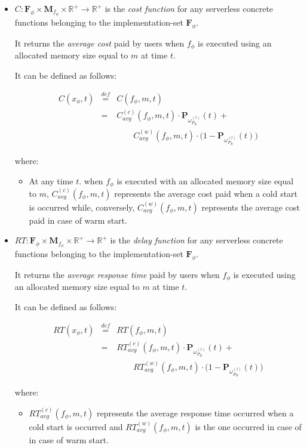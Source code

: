 \documentclass[12pt,a4paper]{report}
\newcommand{\mathDef}{\overset{\textit{def}}{=}}
\begin{document}
\begin{itemize}	
	\item $C : \textbf{F}_{\phi} \times \textbf{M}_{f_{\phi}} \times \mathbb{R}^+ \to \mathbb{R}^+$ is the \textit{cost function} for any serverless concrete functions belonging to the implementation-set $\textbf{F}_{\phi}$. 
	
	It returns the \textit{average cost} paid by users when $f_{\phi}$ is executed using an allocated memory size equal to $m$ at time $t$. 
		
	It can be defined as follows:
	
	\begin{eqnarray}
		C(x_{\phi},t) & \mathDef & C(f_{\phi},m,t) \nonumber \\
		& = & C_{avg}^{(c)}(f_{\phi}, m,t) \cdot \textbf{P}_{\omega_{P_R}^{(l)}}(t) + \\
		& & \qquad C_{avg}^{(w)}(f_{\phi}, m,t) \cdot \Big( 1 - \textbf{P}_{\omega_{P_R}^{(l)}}(t)  \Big) \nonumber
	\end{eqnarray}
	
	where:
	
	\begin{itemize}
		\item At any time $t$. when $f_{\phi}$ is executed with an allocated memory size equal to $m$, 
		$C_{avg}^{(c)}(f_{\phi}, m,t)$ represents the average cost paid when a cold start is occurred while, conversely, $C_{avg}^{(w)}(f_{\phi}, m,t)$ represents the average cost paid in case of warm start.
	\end{itemize}
	
	
	\item $RT : \textbf{F}_{\phi} \times \textbf{M}_{f_{\phi}} \times \mathbb{R}^+ \to \mathbb{R}^+$ is the \textit{delay function} for any serverless concrete functions belonging to the implementation-set $\textbf{F}_{\phi}$. 
	
	It returns the \textit{average response time} paid by users when $f_{\phi}$ is executed using an allocated memory size equal to $m$ at time $t$. 
	
	It can be defined as follows:
	
	\begin{eqnarray}
		RT(x_{\phi},t) & \mathDef & RT(f_{\phi},m,t) \nonumber \\
		& = & RT_{avg}^{(c)}(f_{\phi}, m,t) \cdot \textbf{P}_{\omega_{P_R}^{(l)}}(t) + \\ 
		& & \qquad RT_{avg}^{(w)}(f_{\phi}, m,t) \cdot \Big( 1 - \textbf{P}_{\omega_{P_R}^{(l)}}(t)  \Big) \nonumber
	\end{eqnarray}

	where:
	
	\begin{itemize}
		\item $RT_{avg}^{(c)}(f_{\phi}, m,t)$ represents the average response time occurred when a cold start is occurred and $RT_{avg}^{(w)}(f_{\phi}, m,t)$ is the one occurred in case of in case of warm start.
	\end{itemize}
\end{itemize}
\end{document}
